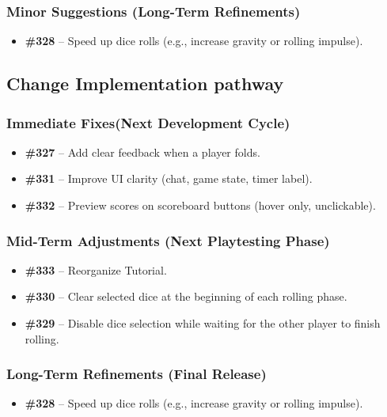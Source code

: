 \documentclass[12pt, titlepage]{article}
\begin{document}
\subsubsection{Minor Suggestions (Long-Term Refinements)}
\begin{itemize}
    \item \textbf{\#328} – Speed up dice rolls (e.g., increase gravity or rolling impulse).
\end{itemize}

\subsection{Change Implementation pathway}

\subsubsection{Immediate Fixes(Next Development Cycle)}
\begin{itemize}
    \item \textbf{\#327} – Add clear feedback when a player folds.
    \item \textbf{\#331} – Improve UI clarity (chat, game state, timer label).
    \item \textbf{\#332} – Preview scores on scoreboard buttons (hover only, unclickable).
\end{itemize}

\subsubsection{Mid-Term Adjustments (Next Playtesting Phase)}
\begin{itemize}
    \item \textbf{\#333} – Reorganize Tutorial.
    \item \textbf{\#330} – Clear selected dice at the beginning of each rolling phase.
    \item \textbf{\#329} – Disable dice selection while waiting for the other player to finish rolling.
\end{itemize}

\subsubsection{Long-Term Refinements (Final Release)}
\begin{itemize}
    \item \textbf{\#328} – Speed up dice rolls (e.g., increase gravity or rolling impulse).
\end{itemize}
\end{document}
